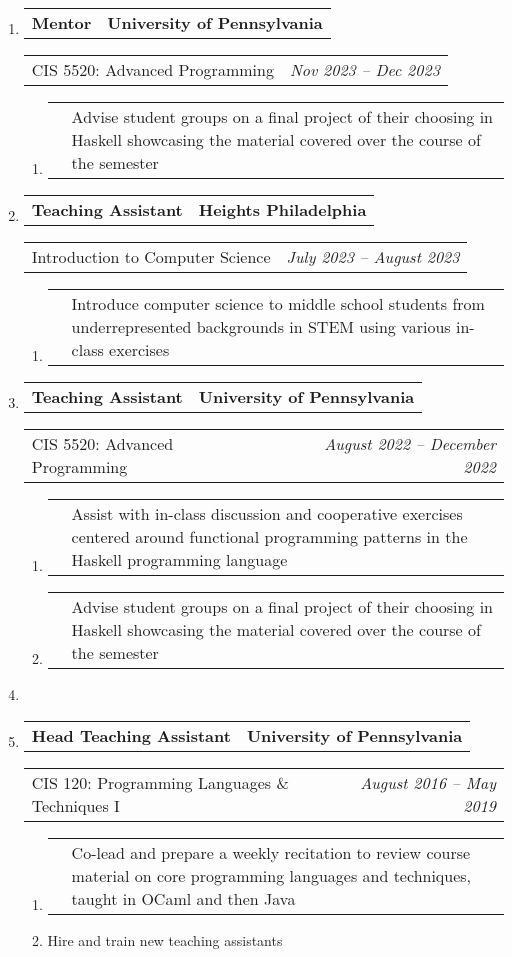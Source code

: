 \documentclass[letterpaper]{article}
\makeatletter
\newcommand*{\tabulardef}[3]{\begin{tabular}[t]{@{}lp{\dimexpr\linewidth-#1}@{}}
    #2&#3
\end{tabular}}
\newcommand{\headerrow}[2]
{\begin{tabular*}{\linewidth}{l@{\extracolsep{\fill}}r}
	#1 &
	#2 \\
\end{tabular*}}
\makeatother
\begin{document}
\begin{enumerate}[label=]
	\parskip=-0.25em

    \item
        \headerrow
            {\textbf{Mentor}}
            {\textbf{University of Pennsylvania}}
        \headerrow
            {CIS 5520: Advanced Programming}
            {\emph{Nov 2023 -- Dec 2023}}
        \begin{enumerate}[label= *]
            \parskip=-0.1em
        \item\tabulardef{5cm}{}{Advise student groups on a final project of their choosing in Haskell showcasing the material covered over the course of the semester}
        \end{enumerate}

    \item
		\headerrow
			{\textbf{Teaching Assistant}}
			{\textbf{Heights Philadelphia}}
	\headerrow
		{Introduction to Computer Science}
		{\emph{July 2023 -- August 2023}}
	\begin{enumerate}[label= *]
		\parskip=-0.1em
    \item\tabulardef{5cm}{}{Introduce computer science to middle school students from underrepresented backgrounds in STEM using various in-class exercises}
	\end{enumerate}

    \newpage

	\item
		\headerrow
			{\textbf{Teaching Assistant}}
			{\textbf{University of Pennsylvania}}
	\headerrow
		{CIS 5520: Advanced Programming}
		{\emph{August 2022 -- December 2022}}
	\begin{enumerate}[label= *]
		\parskip=-0.1em
        \item\tabulardef{5cm}{}{Assist with in-class discussion and cooperative exercises centered around functional programming patterns in the Haskell programming language}        
        \item\tabulardef{5cm}{}{Advise student groups on a final project of their choosing in Haskell showcasing the material covered over the course of the semester}
	\end{enumerate}

     \item

	\item
		\headerrow
			{\textbf{Head Teaching Assistant}}
			{\textbf{University of Pennsylvania}}
	\headerrow
		{CIS 120: Programming Languages \& Techniques I}
		{\emph{August 2016 -- May 2019}}
	\begin{enumerate}[label= *]
		\parskip=-0.1em
        \item\tabulardef{5cm}{}{Co-lead and prepare a weekly recitation to review course material on core programming languages and techniques, taught in OCaml and then Java}
		\item Hire and train new teaching assistants
	\end{enumerate}
\end{enumerate}
\end{document}
